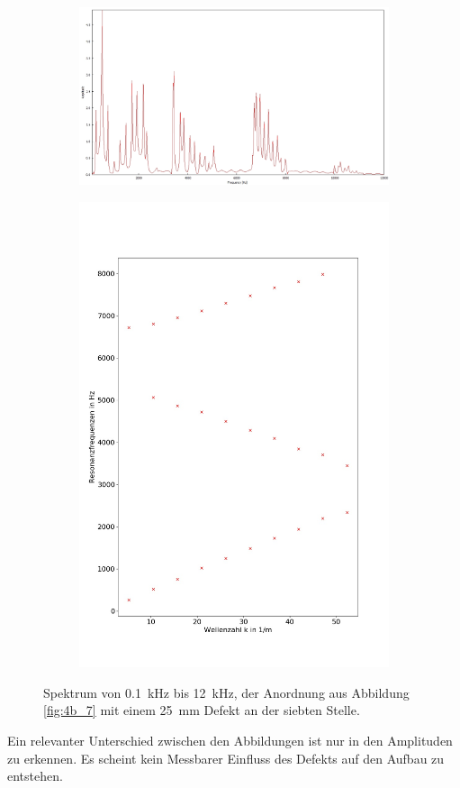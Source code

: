 \begin{figure}
\centering
\begin{subfigure}{0.65\textwidth}
\includegraphics[width=\textwidth]{content/messungen/Chapter4b/4b_7_2c.jpg}
\end{subfigure}
\begin{subfigure}{0.34\textwidth}
\includegraphics[width=\textwidth]{content/Scripts/4b_7_2c.jpg}
\end{subfigure}
\caption{Spektrum von 0.1~kHz bis 12~kHz, der Anordnung aus Abbildung \ref{fig:4b_7} mit einem 25~mm Defekt an der siebten Stelle.}
\label{fig:4b_7_2c}
\end{figure}
Ein relevanter Unterschied zwischen den Abbildungen ist nur in den Amplituden zu erkennen. 
Es scheint kein Messbarer Einfluss des Defekts auf den Aufbau zu entstehen.